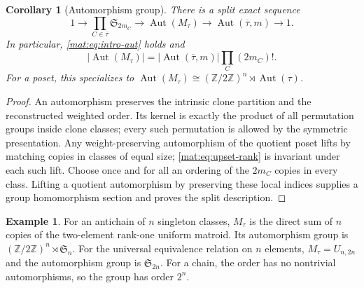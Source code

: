 \documentclass[11pt]{article}
\numberwithin{equation}{section}
\newtheorem{corollary}[theorem]{Corollary}
\theoremstyle{definition}
\newtheorem{example}[theorem]{Example}%
\newcommand{\Z}{\mathbb Z}
\newcommand{\Aut}{\operatorname{Aut}}
\begin{document}
\begin{corollary}[Automorphism group]\label{mat:cor:automorphism}
There is a split exact sequence
\[
 1\longrightarrow\prod_{C\in\overline\tau}\mathfrak S_{2m_C}
 \longrightarrow\Aut(M_\tau)
 \longrightarrow\Aut(\overline\tau,m)\longrightarrow1.
\]
In particular, \eqref{mat:eq:intro-aut} holds and
\begin{equation}
 |\Aut(M_\tau)|=|\Aut(\overline\tau,m)|\prod_C(2m_C)!.
\label{mat:eq:aut-order}
\end{equation}
For a poset, this specializes to
$\Aut(M_\tau)\cong(\Z/2\Z)^n\rtimes\Aut(\tau)$.
\end{corollary}
\begin{proof}
An automorphism preserves the intrinsic clone partition and the
reconstructed weighted order. Its kernel is exactly the product of all
permutation groups inside clone classes; every such permutation is allowed
by the symmetric presentation. Any weight-preserving automorphism of the
quotient poset lifts by matching copies in classes of equal size;
\eqref{mat:eq:upset-rank} is invariant under each such lift. Choose
once and for all an ordering of the $2m_C$ copies in every class. Lifting a
quotient automorphism by preserving these local indices supplies a group
homomorphism section and proves the split description.
\end{proof}

\begin{example}
For an antichain of $n$ singleton classes, $M_\tau$ is the direct sum of
$n$ copies of the two-element rank-one uniform matroid. Its automorphism
group is $(\Z/2\Z)^n\rtimes\mathfrak S_n$. For the universal equivalence
relation on $n$ elements, $M_\tau=U_{n,2n}$ and the automorphism group is
$\mathfrak S_{2n}$. For a chain, the order has no nontrivial automorphisms,
so the group has order $2^n$.
\end{example}
\end{document}
